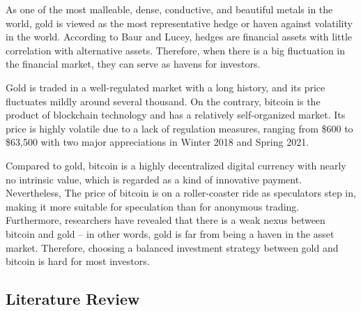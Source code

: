 \documentclass{mcmthesis}
\begin{document}
	As one of the most malleable, dense, conductive, and beautiful metals in the world, gold is viewed as the most representative hedge or haven against volatility in the world. According to Baur and Lucey, hedges are financial assets with little correlation with alternative assets. Therefore, when there is a big fluctuation in the financial market, they can serve as havens for investors. 
	
	Gold is traded in a well-regulated market with a long history, and its price fluctuates mildly around several thousand. On the contrary, bitcoin is the product of blockchain technology and has a relatively self-organized market. Its price is highly volatile due to a lack of regulation measures, ranging from \$600 to \$63,500 with two major appreciations in Winter 2018 and Spring 2021. 
	
	Compared to gold, bitcoin is a highly decentralized digital currency with nearly no intrinsic value, which is regarded as a kind of innovative payment. Nevertheless, The price of bitcoin is on a roller-coaster ride as speculators step in, making it more suitable for speculation than for anonymous trading. Furthermore, researchers have revealed that there is a weak nexus between bitcoin and gold -- in other words, gold is far from being a haven in the asset market. Therefore, choosing a balanced investment strategy between gold and bitcoin is hard for most investors. 
	
	\subsection{Literature Review}
	
\end{document}
